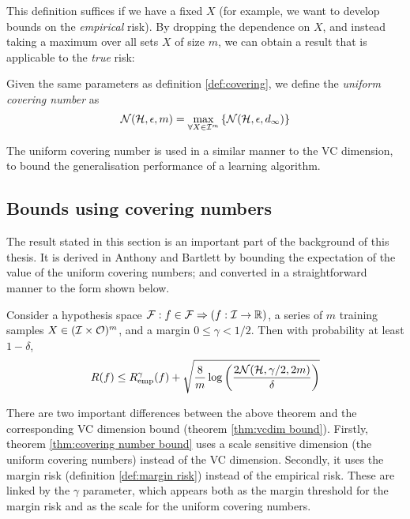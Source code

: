 This definition suffices if we have a fixed $X$ (for example, we want
to develop bounds on the \emph{empirical} risk).  By dropping the
dependence on $X$, and instead taking a maximum over all sets
$X$ of size $m$, we can obtain a result that is applicable to the
\emph{true} risk: 

\begin{definition}
Given the same parameters as definition \ref{def:covering}, we define
the \emph{uniform covering number} as
\begin{equation}
\label{eqn:uniform covering numbers}
\mathcal{N}({\mathcal{H}}, {\epsilon}, {m}) = \max_{\forall X \in \mathcal{I}^m} \left\{
\mathcal{N}({\mathcal{H}}, {\epsilon}, {d_{\infty}}) \right\}
\end{equation}
\end{definition}

The uniform covering number is used in a similar manner to the VC
dimension, to bound the generalisation performance of a learning
algorithm. 

\subsection{Bounds using covering numbers}
\label{sec:covering number bounds}

The result stated in this section is an important part of the
background of this thesis.  It is derived in Anthony and Bartlett
\cite{Anthony98} by bounding the expectation of the value of the
uniform covering numbers; and converted in a straightforward manner to
the form shown below.

\begin{theorem}
\label{thm:covering number bound}
Consider a hypothesis space $\mathcal{F} : f \in \mathcal{F} \Rightarrow (f : \mathcal{I}
\rightarrow \mathbb{R})$, a series of $m$ training samples $X \in
(\mathcal{I} \times \mathcal{O})^m$, and a margin $0 \leq \gamma < 1/2$.  Then
with probability at least $1 - \delta$,  
\begin{equation}
R(f) \leq R_{\mathrm{emp}}^{\gamma}(f) + \sqrt{\frac{8}{m} \log \left( \frac{2
\mathcal{N}({\mathcal{H}}, {\gamma/2}, {2m})}{\delta} \right)}
\label{eqn:covering number bound}
\end{equation}
\end{theorem}

There are two important differences between the above theorem and the
corresponding VC dimension bound (theorem \ref{thm:vcdim bound}). 
Firstly, theorem \ref{thm:covering number bound} uses a scale
sensitive dimension (the uniform covering numbers) instead of the VC
dimension.  Secondly, it uses the margin risk (definition
\ref{def:margin risk}) instead of the empirical risk.  These are linked
by the $\gamma$ parameter, which appears both as the margin threshold
for the margin risk and as the scale for the uniform covering numbers.

